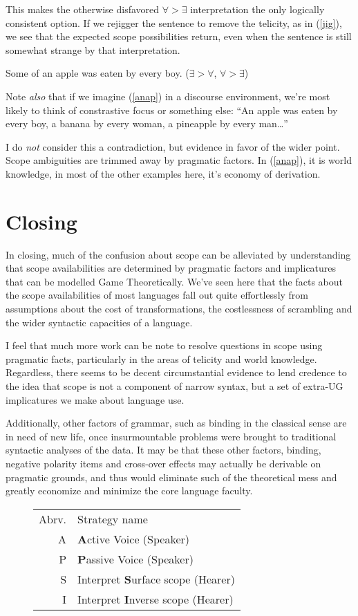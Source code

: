 \documentclass{article}
\begin{document}
This makes the otherwise disfavored $\forall>\exists$ interpretation the only logically consistent option. If we rejigger the sentence to remove the telicity, as in (\ref{jig}), we see that the expected scope possibilities return, even when the sentence is still somewhat strange by that interpretation.

\begin{exe}
\ex Some of an apple was eaten by every boy. \hfill ($\exists>\forall$, $\forall>\exists$)\label{jig}
\end{exe}

Note \emph{also} that if we imagine (\ref{anap}) in a discourse environment, we're most likely to think of constrastive focus or something else: ``An apple was eaten by every boy, a banana by every woman, a pineapple by every man\ldots'' 

I do \emph{not} consider this a contradiction, but evidence in favor of the wider point.
Scope ambiguities are trimmed away by pragmatic factors. In (\ref{anap}), it is world knowledge, in most of the other examples here, it's economy of derivation.

\section{Closing}


In closing, much of the confusion about scope can be alleviated by understanding that scope availabilities are determined by pragmatic factors and implicatures that can be modelled Game Theoretically. We've seen here that the facts about the scope availabilities of most languages fall out quite effortlessly from assumptions about the cost of transformations, the costlessness of scrambling and the wider syntactic capacities of a language.

I feel that much more work can be note to resolve questions in scope using pragmatic facts, particularly in the areas of telicity and world knowledge. Regardless, there seems to be decent circumstantial evidence to lend credence to the idea that scope is not a component of narrow syntax, but a set of extra-UG implicatures we make about language use.

Additionally, other factors of grammar, such as binding in the classical sense are in need of new life, once insurmountable problems were brought to traditional syntactic analyses of the data. It may be that these other factors, binding, negative polarity items and cross-over effects may actually be derivable on pragmatic grounds, and thus would eliminate such of the theoretical mess and greatly economize and minimize the core language faculty.



\begin{figure}
	\begin{tabular}{rl}
		Abrv.& Strategy name\\
		A & \textbf{A}ctive Voice (Speaker)\\
		P & \textbf{P}assive Voice (Speaker)\\
		S & Interpret \textbf{S}urface scope (Hearer)\\
		I & Interpret \textbf{I}nverse scope (Hearer)\\
	\end{tabular}
\end{figure}



\printbibliography
\end{document}
